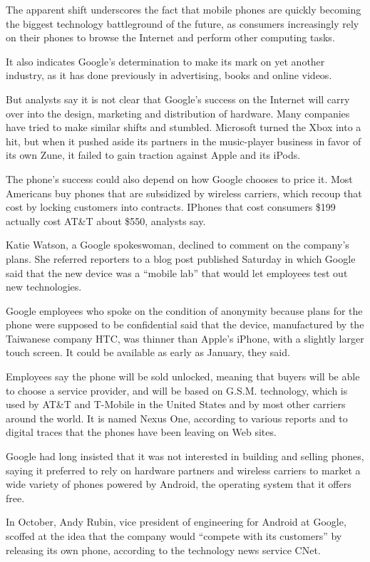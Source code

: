 ﻿\documentclass[12pt]{article}
\begin{document}
The apparent shift underscores the fact that mobile phones are quickly becoming the biggest
technology battleground of the future, as consumers increasingly rely on their phones to browse the
Internet and perform other computing tasks.

It also indicates Google's determination to make its mark on yet another industry, as it has done
previously in advertising, books and online videos.

But analysts say it is not clear that Google's success on the Internet will carry over into the
design, marketing and distribution of hardware. Many companies have tried to make similar shifts and
stumbled. Microsoft turned the Xbox into a hit, but when it pushed aside its partners in the
music-player business in favor of its own Zune, it failed to gain traction against Apple and its
iPods.

The phone's success could also depend on how Google chooses to price it. Most Americans buy phones
that are subsidized by wireless carriers, which recoup that cost by locking customers into
contracts. IPhones that cost consumers \$199 actually cost AT\&T about \$550, analysts say.

Katie Watson, a Google spokeswoman, declined to comment on the company's plans. She referred
reporters to a blog post published Saturday in which Google said that the new device was a ``mobile
lab'' that would let employees test out new technologies.

Google employees who spoke on the condition of anonymity because plans for the phone were supposed
to be confidential said that the device, manufactured by the Taiwanese company HTC, was thinner than
Apple's iPhone, with a slightly larger touch screen. It could be available as early as January, they
said.

Employees say the phone will be sold unlocked, meaning that buyers will be able to choose a service
provider, and will be based on G.S.M. technology, which is used by AT\&T and T-Mobile in the United
States and by most other carriers around the world. It is named Nexus One, according to various
reports and to digital traces that the phones have been leaving on Web sites.

Google had long insisted that it was not interested in building and selling phones, saying it
preferred to rely on hardware partners and wireless carriers to market a wide variety of phones
powered by Android, the operating system that it offers free.

In October, Andy Rubin, vice president of engineering for Android at Google, scoffed\cite{scoff} at
the idea that the company would ``compete with its customers'' by releasing its own phone, according
to the technology news service CNet.
\end{document}
